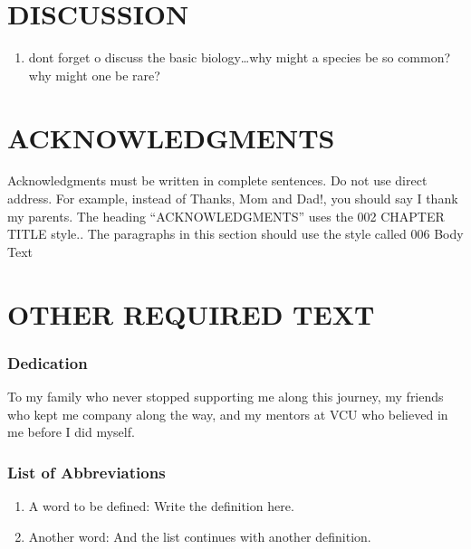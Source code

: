 \documentclass[
]{article}
\providecommand{\tightlist}{%
  \setlength{\itemsep}{0pt}\setlength{\parskip}{0pt}}
\begin{document}
\hypertarget{discussion}{%
\section{DISCUSSION}\label{discussion}}

\begin{enumerate}
\def\labelenumi{\arabic{enumi}.}
\tightlist
\item
  dont forget o discuss the basic biology\ldots why might a species be
  so common? why might one be rare?
\end{enumerate}

\hypertarget{acknowledgments}{%
\section{ACKNOWLEDGMENTS}\label{acknowledgments}}

Acknowledgments must be written in complete sentences. Do not use direct
address. For example, instead of Thanks, Mom and Dad!, you should say I
thank my parents. The heading ``ACKNOWLEDGMENTS'' uses the 002 CHAPTER
TITLE style.. The paragraphs in this section should use the style called
006 Body Text

\hypertarget{other-required-text}{%
\section{OTHER REQUIRED TEXT}\label{other-required-text}}

\hypertarget{dedication}{%
\subsubsection{Dedication}\label{dedication}}

To my family who never stopped supporting me along this journey, my
friends who kept me company along the way, and my mentors at VCU who
believed in me before I did myself.

\hypertarget{list-of-abbreviations}{%
\subsubsection{List of Abbreviations}\label{list-of-abbreviations}}

\begin{enumerate}
\def\labelenumi{\arabic{enumi}.}
\tightlist
\item
  A word to be defined: Write the definition here.
\item
  Another word: And the list continues with another definition.
\end{enumerate}
\end{document}

